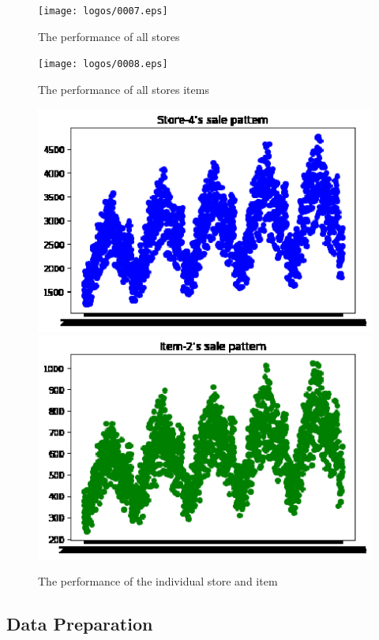 \begin{figure}[htbp]
	\centering
	
	\texttt{[image: logos/0007.eps]}
	\caption{  The performance of all stores}\label{fig:005.eps}
\end{figure}

\begin{figure}[htbp]
	\centering
	
	\texttt{[image: logos/0008.eps]}
	\caption{ The performance of all stores items}\label{fig:006.eps}
\end{figure}

\begin{figure}[htbp]
	\centering
	
  \includegraphics[scale=0.7]{logos/0009.eps}
  \includegraphics[scale=0.7]{logos/0010.eps}
	\caption{  The performance of the individual store and item}\label{fig:007.eps}
\end{figure}

\subsection{Data Preparation}
\ 

